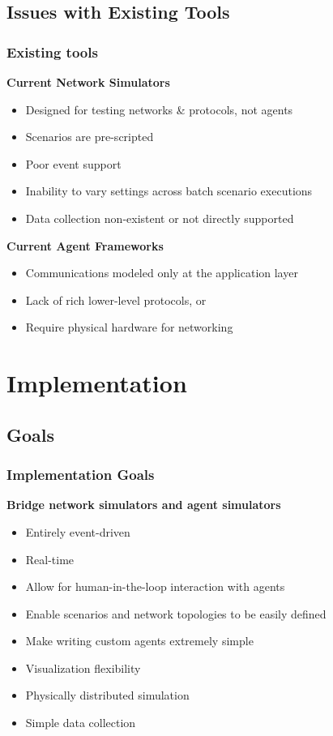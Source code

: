 \documentclass[mathserif]{beamer}
\begin{document}
\subsection{Issues with Existing Tools}
\frame
{
    \frametitle{Existing tools}
    \textbf{Current Network Simulators}
    \begin{itemize}
        \item Designed for testing networks \& protocols, not agents 
        \item Scenarios are pre-scripted
        \item Poor event support
        \item Inability to vary settings across batch scenario executions
        \item Data collection non-existent or not directly supported
    \end{itemize}
    \textbf{Current Agent Frameworks}
    \begin{itemize}
        \item Communications modeled only at the application layer
        \item Lack of rich lower-level protocols, or
        \item Require physical hardware for networking
    \end{itemize}
}

\section{Implementation}

\subsection{Goals}
\frame
{
    \frametitle{Implementation Goals}
    \textbf{Bridge network simulators and agent simulators}
    \begin{itemize}
        \item Entirely event-driven
        \item Real-time
        \item Allow for human-in-the-loop interaction with agents
        \item Enable scenarios and network topologies to be easily defined
        \item Make writing custom agents extremely simple
        \item Visualization flexibility
        \item Physically distributed simulation
        \item Simple data collection
    \end{itemize}
}
\end{document}
